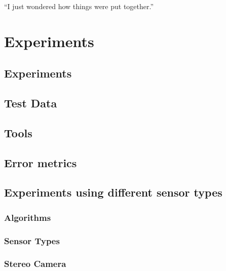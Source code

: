 \begin{savequote}[8cm]
  ``I just wondered how things were put together.''
\end{savequote}
\makeatletter
\chapter{Experiments}
\label{ch:Experiments}

\section{Experiments}



\section{Test Data}
\label{TestDataSection}


\section{Tools}
\label{ToolsSection}


\section{Error metrics}
\label{metricsSection}


\section{Experiments using different sensor types}
\label{Sec:FVRSOTA}
\subsection{Algorithms} 
\label{AlgorithmsSection}


\subsection{Sensor Types} 
\label{SensorTypesExpsSection}


\subsection{Stereo Camera}
\label{StereoSOTA}


